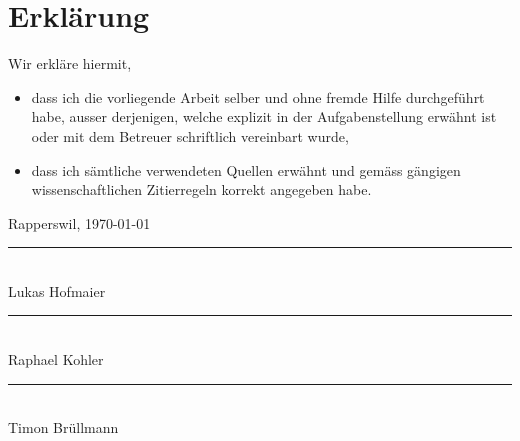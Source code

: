\chapter*{Erklärung}
\label{cha:declaration}


Wir erkläre hiermit,
\begin{itemize}
\item dass ich die vorliegende Arbeit selber und oh\-ne frem\-de Hil\-fe durch\-ge\-führt habe, ausser derjenigen, welche explizit in der Aufgabenstellung erwähnt ist oder mit dem Betreuer schriftlich vereinbart wurde,
\item dass ich sämtliche verwendeten Quellen erwähnt und gemäss gängigen wissenschaftlichen Zitierregeln korrekt angegeben habe.
\end{itemize}

\vspace{1cm}

\noindent
Rapperswil, \today

\vspace{1.5cm}

\noindent
\rule{6cm}{0.4pt}
\noindent
\vspace{0.5cm} \\
Lukas Hofmaier


\vspace{1.5cm}

\noindent
\rule{6cm}{0.4pt}
\noindent
\vspace{0.5cm} \\
Raphael Kohler


\vspace{1.5cm}

\noindent
\rule{6cm}{0.4pt}
\noindent
\vspace{0.5cm} \\
Timon Brüllmann